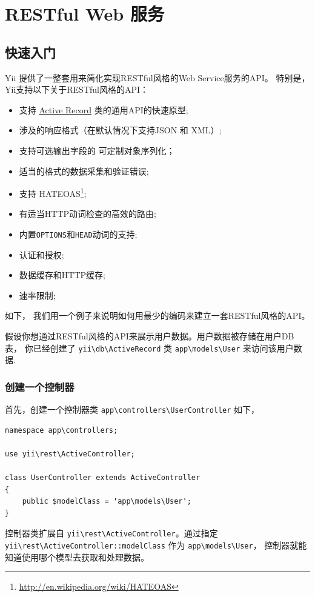 \chapter{RESTful Web 服务}
\label{rest-quick-start.md}\section{快速入门}
Yii 提供了一整套用来简化实现RESTful风格的Web Service服务的API。
特别是，Yii支持以下关于RESTful风格的API：

\begin{itemize}
\item 支持 \hyperref[db-active-record.md]{Active Record} 类的通用API的快速原型;
\item 涉及的响应格式（在默认情况下支持JSON 和 XML）;
\item 支持可选输出字段的 可定制对象序列化；
\item 适当的格式的数据采集和验证错误;
\item 支持 HATEOAS\footnote{\url{http://en.wikipedia.org/wiki/HATEOAS}};
\item 有适当HTTP动词检查的高效的路由;
\item 内置\lstinline|OPTIONS|和\lstinline|HEAD|动词的支持;
\item 认证和授权;
\item 数据缓存和HTTP缓存;
\item 速率限制;
\end{itemize}
如下， 我们用一个例子来说明如何用最少的编码来建立一套RESTful风格的API。

假设你想通过RESTful风格的API来展示用户数据。用户数据被存储在用户DB表，
你已经创建了 \texttt{yii{\allowbreak{}\textbackslash}db{\allowbreak{}\textbackslash}ActiveRecord} 类 \lstinline|app\models\User| 来访问该用户数据.

\subsection{创建一个控制器 \label{rest-quick-start.md::creating-controller}}
首先，创建一个控制器类 \lstinline|app\controllers\UserController| 如下，

\lstset{language=php}\begin{lstlisting}
namespace app\controllers;

use yii\rest\ActiveController;

class UserController extends ActiveController
{
    public $modelClass = 'app\models\User';
}
\end{lstlisting}
控制器类扩展自 \texttt{yii{\allowbreak{}\textbackslash}rest{\allowbreak{}\textbackslash}ActiveController}。通过指定 \texttt{yii{\allowbreak{}\textbackslash}rest{\allowbreak{}\textbackslash}ActiveController\allowbreak{}::\allowbreak{}modelClass}
作为 \lstinline|app\models\User|， 控制器就能知道使用哪个模型去获取和处理数据。

